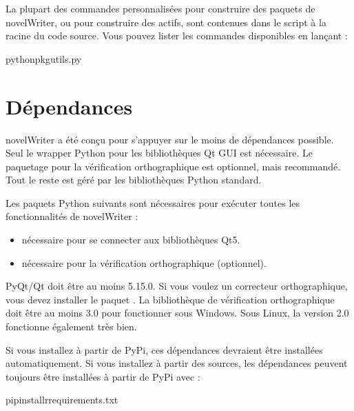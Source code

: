 \documentclass[a4paper,11pt,french]{sphinxmanual}
\begin{document}
\sphinxAtStartPar
La plupart des commandes personnalisées pour construire des paquets de novelWriter, ou pour construire des actifs, sont contenues dans le script  à la racine du code source. Vous pouvez lister les commandes disponibles en lançant :

\begin{sphinxVerbatim}[commandchars=\\\{\}]
pythonpkgutils.py
\end{sphinxVerbatim}


\section{Dépendances}
\label{\detokenize{tech_source:dependencies}}\label{\detokenize{tech_source:a-source-depend}}
\sphinxAtStartPar
novelWriter a été conçu pour s’appuyer sur le moins de dépendances possible. Seul le wrapper Python pour les bibliothèques Qt GUI est nécessaire. Le paquetage pour la vérification orthographique est optionnel, mais recommandé. Tout le reste est géré par les bibliothèques Python standard.

\sphinxAtStartPar
Les paquets Python suivants sont nécessaires pour exécuter toutes les fonctionnalités de novelWriter :
\begin{itemize}
\item {} 
\sphinxAtStartPar
{} \sphinxhyphen{} nécessaire pour se connecter aux bibliothèques Qt5.

\item {} 
\sphinxAtStartPar
{} \sphinxhyphen{} nécessaire pour la vérification orthographique (optionnel).

\end{itemize}

\sphinxAtStartPar
PyQt/Qt doit être au moins 5.15.0. Si vous voulez un correcteur orthographique, vous devez installer le paquet . La bibliothèque de vérification orthographique doit être au moins 3.0 pour fonctionner sous Windows. Sous Linux, la version 2.0 fonctionne également très bien.

\sphinxAtStartPar
Si vous installez à partir de PyPi, ces dépendances devraient être installées automatiquement. Si vous installez à partir des sources, les dépendances peuvent toujours être installées à partir de PyPi avec :

\begin{sphinxVerbatim}[commandchars=\\\{\}]
pipinstall\PYGZhy{}rrequirements.txt
\end{sphinxVerbatim}
\end{document}
